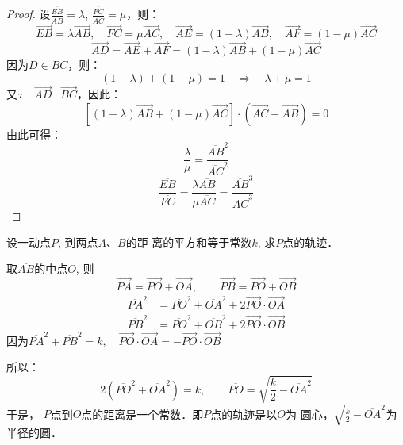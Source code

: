 \begin{proof}
设$\frac{\overline{EB}}{\overline{AB}}=\lambda$, $\frac{\overline{FC}}{\overline{AC}}=\mu$，则：  
\[\Vec{EB}=\lambda\Vec{AB},\quad \Vec{FC}=\mu\Vec{AC},\quad \Vec{AE}=(1-\lambda)\Vec{AB},\quad \Vec{AF}=(1-\mu)\Vec{AC}\]
\[\Vec{AD}=\Vec{AE}+\Vec{AF}=(1-\lambda)\Vec{AB}+(1-\mu)\Vec{AC}\]
因为$D\in BC$，则：
\[(1-\lambda)+(1-\mu)=1\quad \Rightarrow\quad \lambda+\mu=1\]
又$\because\quad \Vec{AD}\bot \Vec{BC}$，因此：
\[\left[(1-\lambda)\Vec{AB}+(1-\mu)\Vec{AC}\right]\cdot \left(\Vec{AC}-\Vec{AB}\right)=0\]
由此可得：
\[\frac{\lambda}{\mu}=\frac{\overline{AB}^2}{\overline{AC}^2}\]
\[\frac{\overline{EB}}{\overline{FC}}=\frac{\lambda\overline{AB}}{\mu\overline{AC}}=\frac{\overline{AB}^3}{\overline{AC}^3}\]
\end{proof}

\begin{figure}[htp]\centering
    \begin{minipage}[t]{0.48\textwidth}
    \centering
{}
    \caption{}
    \end{minipage}
    \begin{minipage}[t]{0.48\textwidth}
    \centering
    \caption{}
    \end{minipage}
    \end{figure}

\begin{example}
    设一动点$P$, 到两点$A$、$B$的距
离的平方和等于常数$k$, 求$P$点的轨迹．
\end{example}

\begin{solution}
    取$\overline{AB}$的中点$O$, 则
\[\Vec{PA}=\Vec{PO}+\Vec{OA},\qquad \Vec{PB}=\Vec{PO}+\Vec{OB}\]
\[\begin{split}
    \overline{PA}^2&=\overline{PO}^2+\overline{OA}^2+2\Vec{PO}\cdot\Vec{OA}\\
    \overline{PB}^2&=\overline{PO}^2+\overline{OB}^2+2\Vec{PO}\cdot \Vec{OB}
\end{split}\]
因为$\overline{PA}^2+\overline{PB}^2=k,\quad \Vec{PO}\cdot\Vec{OA}=-\Vec{PO}\cdot \Vec{OB}$

所以：
\[2\left(\overline{PO}^2+\overline{OA}^2\right)=k,\qquad \overline{PO}=\sqrt{\frac{k}{2}-\overline{OA}^2}\]
于是，
$P$点到$O$点的距离是一个常数．即$P$点的轨迹是以$O$为
圆心，$\sqrt{\frac{k}{2}-\overline{OA}^2}$为半径的圆．
\end{solution}

